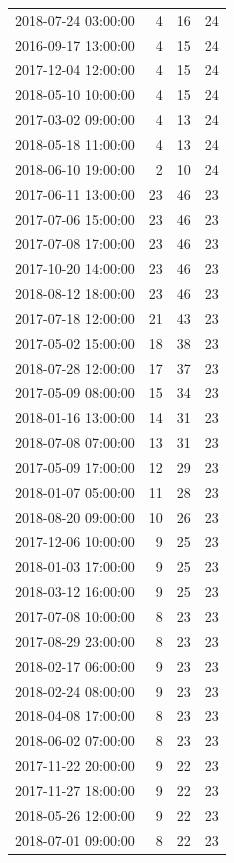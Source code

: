 \begin{tabular}{lrrr}
2018-07-24 03:00:00 & 4 & 16 & 24 \\
2016-09-17 13:00:00 & 4 & 15 & 24 \\
2017-12-04 12:00:00 & 4 & 15 & 24 \\
2018-05-10 10:00:00 & 4 & 15 & 24 \\
2017-03-02 09:00:00 & 4 & 13 & 24 \\
2018-05-18 11:00:00 & 4 & 13 & 24 \\
2018-06-10 19:00:00 & 2 & 10 & 24 \\
2017-06-11 13:00:00 & 23 & 46 & 23 \\
2017-07-06 15:00:00 & 23 & 46 & 23 \\
2017-07-08 17:00:00 & 23 & 46 & 23 \\
2017-10-20 14:00:00 & 23 & 46 & 23 \\
2018-08-12 18:00:00 & 23 & 46 & 23 \\
2017-07-18 12:00:00 & 21 & 43 & 23 \\
2017-05-02 15:00:00 & 18 & 38 & 23 \\
2018-07-28 12:00:00 & 17 & 37 & 23 \\
2017-05-09 08:00:00 & 15 & 34 & 23 \\
2018-01-16 13:00:00 & 14 & 31 & 23 \\
2018-07-08 07:00:00 & 13 & 31 & 23 \\
2017-05-09 17:00:00 & 12 & 29 & 23 \\
2018-01-07 05:00:00 & 11 & 28 & 23 \\
2018-08-20 09:00:00 & 10 & 26 & 23 \\
2017-12-06 10:00:00 & 9 & 25 & 23 \\
2018-01-03 17:00:00 & 9 & 25 & 23 \\
2018-03-12 16:00:00 & 9 & 25 & 23 \\
2017-07-08 10:00:00 & 8 & 23 & 23 \\
2017-08-29 23:00:00 & 8 & 23 & 23 \\
2018-02-17 06:00:00 & 9 & 23 & 23 \\
2018-02-24 08:00:00 & 9 & 23 & 23 \\
2018-04-08 17:00:00 & 8 & 23 & 23 \\
2018-06-02 07:00:00 & 8 & 23 & 23 \\
2017-11-22 20:00:00 & 9 & 22 & 23 \\
2017-11-27 18:00:00 & 9 & 22 & 23 \\
2018-05-26 12:00:00 & 9 & 22 & 23 \\
2018-07-01 09:00:00 & 8 & 22 & 23 \\

\end{tabular}
